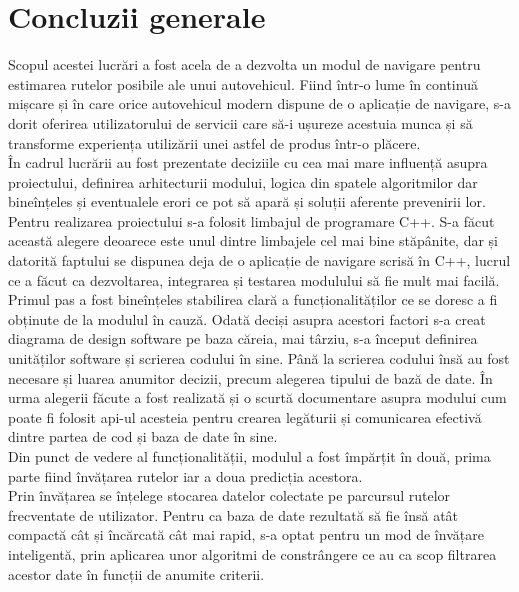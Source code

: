 \section{Concluzii generale} 
Scopul acestei lucrări a fost acela de a dezvolta un modul de navigare pentru estimarea rutelor posibile ale unui autovehicul. Fiind într-o lume în continuă mișcare și în care orice autovehicul modern dispune de o aplicație de navigare, s-a dorit oferirea utilizatorului de servicii care să-i ușureze acestuia munca și să transforme experiența utilizării unei astfel de produs într-o plăcere.
\vspace{6pt}
\\În cadrul lucrării au fost prezentate deciziile cu cea mai mare influență asupra proiectului, definirea arhitecturii modului, logica din spatele algoritmilor dar bineînțeles și eventualele erori ce pot să apară și soluții aferente prevenirii lor.
\vspace{6pt}
\\Pentru realizarea proiectului s-a folosit limbajul de programare C++. S-a făcut această alegere deoarece este unul dintre limbajele cel mai bine stăpânite, dar și datorită faptului se dispunea deja de o aplicație de navigare scrisă în C++, lucrul ce a făcut ca dezvoltarea, integrarea și testarea modulului să fie mult mai facilă.
\vspace{6pt}
\\Primul pas a fost bineînțeles stabilirea clară a funcționalităților ce se doresc a fi obținute de la modulul în cauză. Odată deciși asupra acestori factori s-a creat diagrama de design software pe baza căreia, mai târziu, s-a început definirea unităților software și scrierea codului în sine. Până la scrierea codului însă au fost necesare și luarea anumitor decizii, precum alegerea tipului de bază de date. În urma alegerii făcute a fost realizată și o scurtă documentare asupra modului cum poate fi folosit \acrshort{api}-ul acesteia pentru crearea legăturii și comunicarea efectivă dintre partea de cod și baza de date în sine.
\vspace{6pt}
\\Din punct de vedere al funcționalității, modulul a fost împărțit în două, prima parte fiind învățarea rutelor iar a doua predicția acestora.
\vspace{6pt}
\\Prin învățarea se înțelege stocarea datelor colectate pe parcursul rutelor frecventate de utilizator. Pentru ca baza de date rezultată să fie însă atât compactă cât și încărcată cât mai rapid, s-a optat pentru un mod de învățare inteligentă, prin aplicarea unor algoritmi de constrângere ce au ca scop filtrarea acestor date în funcții de anumite criterii.
